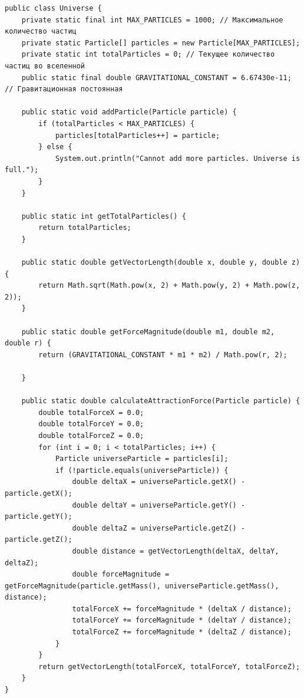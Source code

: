 \documentclass[a4paper, 14pt]{extarticle}
\begin{document}
\begin{lstlisting}[language={},caption={класс Universe},label={lst:code2}]
public class Universe {
    private static final int MAX_PARTICLES = 1000; // Максимальное количество частиц
    private static Particle[] particles = new Particle[MAX_PARTICLES];
    private static int totalParticles = 0; // Текущее количество частиц во вселенной
    public static final double GRAVITATIONAL_CONSTANT = 6.67430e-11; // Гравитационная постоянная

    public static void addParticle(Particle particle) {
        if (totalParticles < MAX_PARTICLES) {
            particles[totalParticles++] = particle;
        } else {
            System.out.println("Cannot add more particles. Universe is full.");
        }
    }

    public static int getTotalParticles() {
        return totalParticles;
    }

    public static double getVectorLength(double x, double y, double z) {
        return Math.sqrt(Math.pow(x, 2) + Math.pow(y, 2) + Math.pow(z, 2));
    }

    public static double getForceMagnitude(double m1, double m2, double r) {
        return (GRAVITATIONAL_CONSTANT * m1 * m2) / Math.pow(r, 2);

    }

    public static double calculateAttractionForce(Particle particle) {
        double totalForceX = 0.0;
        double totalForceY = 0.0;
        double totalForceZ = 0.0;
        for (int i = 0; i < totalParticles; i++) {
            Particle universeParticle = particles[i];
            if (!particle.equals(universeParticle)) {
                double deltaX = universeParticle.getX() - particle.getX();
                double deltaY = universeParticle.getY() - particle.getY();
                double deltaZ = universeParticle.getZ() - particle.getZ();
                double distance = getVectorLength(deltaX, deltaY, deltaZ);
                double forceMagnitude = getForceMagnitude(particle.getMass(), universeParticle.getMass(), distance);
                totalForceX += forceMagnitude * (deltaX / distance);
                totalForceY += forceMagnitude * (deltaY / distance);
                totalForceZ += forceMagnitude * (deltaZ / distance);
            }
        }
        return getVectorLength(totalForceX, totalForceY, totalForceZ);
    }
}
\end{lstlisting}
\end{document}
